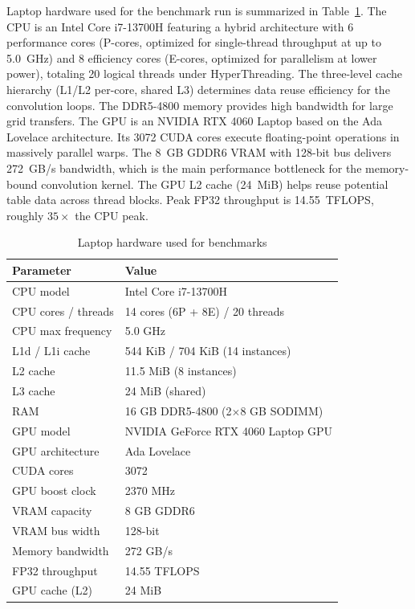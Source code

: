 \documentclass[conference]{IEEEtran}
\begin{document}
Laptop hardware used for the benchmark run is summarized in Table~\ref{tab:laptop_hw}. The CPU is an Intel Core i7-13700H featuring a hybrid architecture with 6 performance cores (P-cores, optimized for single-thread throughput at up to 5.0~GHz) and 8 efficiency cores (E-cores, optimized for parallelism at lower power), totaling 20 logical threads under HyperThreading. The three-level cache hierarchy (L1/L2 per-core, shared L3) determines data reuse efficiency for the convolution loops. The DDR5-4800 memory provides high bandwidth for large grid transfers. The GPU is an NVIDIA RTX 4060 Laptop based on the Ada Lovelace architecture. Its 3072 CUDA cores execute floating-point operations in massively parallel warps. The 8~GB GDDR6 VRAM with 128-bit bus delivers 272~GB/s bandwidth, which is the main performance bottleneck for the memory-bound convolution kernel. The GPU L2 cache (24~MiB) helps reuse potential table data across thread blocks. Peak FP32 throughput is 14.55~TFLOPS, roughly $35\times$ the CPU peak.

\begin{table}[htbp]
\caption{Laptop hardware used for benchmarks}
\begin{center}
\begin{tabular}{|l|l|}
\hline
\textbf{Parameter} & \textbf{Value} \\
\hline
CPU model & Intel Core i7-13700H \\
CPU cores / threads & 14 cores (6P + 8E) / 20 threads \\
CPU max frequency & 5.0 GHz \\
L1d / L1i cache & 544 KiB / 704 KiB (14 instances) \\
L2 cache & 11.5 MiB (8 instances) \\
L3 cache & 24 MiB (shared) \\
RAM & 16 GB DDR5-4800 (2$\times$8 GB SODIMM) \\
GPU model & NVIDIA GeForce RTX 4060 Laptop GPU \\
GPU architecture & Ada Lovelace \\
CUDA cores & 3072 \\
GPU boost clock & 2370 MHz \\
VRAM capacity & 8 GB GDDR6 \\
VRAM bus width & 128-bit \\
Memory bandwidth & 272 GB/s \\
FP32 throughput & 14.55 TFLOPS \\
GPU cache (L2) & 24 MiB \\
\hline
\end{tabular}
\label{tab:laptop_hw}
\end{center}
\end{table}
\end{document}
